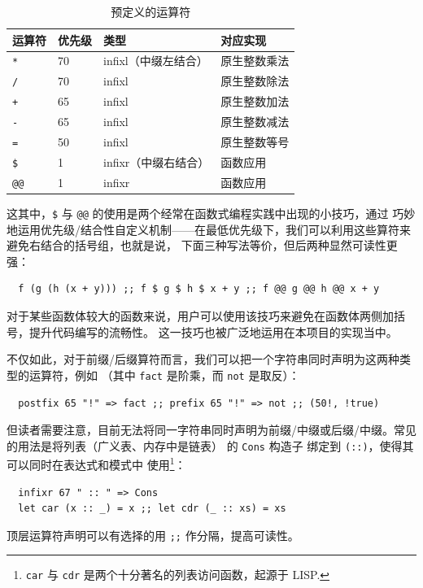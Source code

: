 \documentclass[a4paper, 11pt]{article}
\theoremstyle{remark}\newtheorem*{remark}{Remark}
\theoremstyle{definition}\newtheorem*{definition}{Definition}
\begin{document}
\begin{table}[]
  \centering
  \begin{tabular}{@{}llll@{}}
    \toprule
    运算符 & 优先级 & 类型  & 对应实现                   \\ \midrule
    \texttt{*}        & 70         & infixl（中缀左结合） & 原生整数乘法 \\
    \texttt{/}        & 70         & infixl & 原生整数除法       \\
    \texttt{+}        & 65         & infixl & 原生整数加法       \\
    \texttt{-}        & 65         & infixl & 原生整数减法    \\
    \texttt{=}        & 50         & infixl & 原生整数等号       \\
    \texttt{\$}       & 1          & infixr（中缀右结合）& 函数应用             \\
    \texttt{@@}       & 1          & infixr & 函数应用             \\ \bottomrule
  \end{tabular}
  \caption{预定义的运算符}\label{tab:exproperator-prec}
\end{table}

这其中，\texttt{\$} 与 \texttt{@@} 的使用是两个经常在函数式编程实践中出现的小技巧，通过
巧妙地运用优先级/结合性自定义机制——在最低优先级下，我们可以利用这些算符来避免右结合的括号组，也就是说，
下面三种写法等价，但后两种显然可读性更强：
\begin{verbatim}
  f (g (h (x + y))) ;; f $ g $ h $ x + y ;; f @@ g @@ h @@ x + y
\end{verbatim}
对于某些函数体较大的函数来说，用户可以使用该技巧来避免在函数体两侧加括号，提升代码编写的流畅性。
这一技巧也被广泛地运用在本项目的实现当中。

不仅如此，对于前缀/后缀算符而言，我们可以把一个字符串同时声明为这两种类型的运算符，例如
（其中 \texttt{fact} 是阶乘，而 \texttt{not} 是取反）：
\begin{verbatim}
  postfix 65 "!" => fact ;; prefix 65 "!" => not ;; (50!, !true)
\end{verbatim}
但读者需要注意，目前无法将同一字符串同时声明为前缀/中缀或后缀/中缀。常见的用法是将列表（广义表、内存中是链表）
的 \texttt{Cons} 构造子
绑定到 \texttt{(::)}，使得其可以同时在表达式和模式中
使用\footnote{\texttt{car} 与 \texttt{cdr} 是两个十分著名的列表访问函数，起源于 LISP.}：
\begin{verbatim}
  infixr 67 " :: " => Cons
  let car (x :: _) = x ;; let cdr (_ :: xs) = xs
\end{verbatim}
顶层运算符声明可以有选择的用 \texttt{;;} 作分隔，提高可读性。
\end{document}
